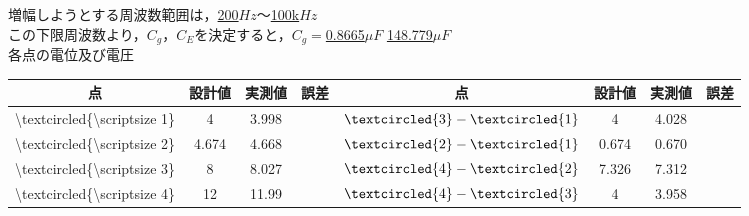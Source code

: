 \documentclass[10pt, a4j, dvipdfmx]{jarticle}
\begin{document}
    \newpage
    増幅しようとする周波数範囲は，\hspace{7mm}\underline{200}$Hz$〜\hspace{7mm}\underline{100k}$Hz$\\
    この下限周波数より，$C_g$，$C_E$を決定すると，$C_g = $\underline{0.8665}$\mu F$\hspace{7mm} \underline{148.779}$\mu F$\\
    各点の電位及び電圧
    \begin{table}[H]
        \begin{tabular}{||c||c|c|c||c||c|c|c||}
        \hline\hline
        点                                                           & 設計値   & 実測値   & 誤差 & 点                                                           & 設計値   & 実測値   & 誤差 \\ \hline\hline
        \textbackslash{}textcircled\{\textbackslash{}scriptsize 1\} & 4     & 3.998 &    & $\textcircled{\scriptsize 3} - \textcircled{\scriptsize 1}$ & 4     & 4.028 &    \\ \hline
        \textbackslash{}textcircled\{\textbackslash{}scriptsize 2\} & 4.674 & 4.668 &    & $\textcircled{\scriptsize 2} - \textcircled{\scriptsize 1}$ & 0.674 & 0.670 &    \\ \hline
        \textbackslash{}textcircled\{\textbackslash{}scriptsize 3\} & 8     & 8.027 &    & $\textcircled{\scriptsize 4} - \textcircled{\scriptsize 2}$ & 7.326 & 7.312 &    \\ \hline
        \textbackslash{}textcircled\{\textbackslash{}scriptsize 4\} & 12    & 11.99 &    & $\textcircled{\scriptsize 4} - \textcircled{\scriptsize 3}$ & 4     & 3.958 &    \\ \hline\hline
        \end{tabular}
    \end{table}
\end{document}
